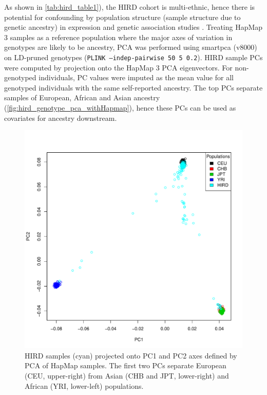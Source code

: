 As shown in \autoref{tab:hird_table1}), the \gls{HIRD} cohort is multi-ethnic, hence there is potential for confounding by population structure (sample structure due to genetic ancestry) in expression and genetic association studies \autocite{price2006PrincipalComponentsAnalysis,eu-ahsunthornwattana2014ComparisonMethodsAccount,brown2018ExpressionReflectsPopulation}.
Treating HapMap 3 samples as a reference population where the major axes of variation in genotypes are likely to be ancestry, \gls{PCA} was performed using smartpca (v8000) on \gls{LD}-pruned genotypes (\texttt{PLINK --indep-pairwise 50 5 0.2}).
\gls{HIRD} sample \glspl{PC} were computed by projection onto the HapMap 3 \gls{PCA} eigenvectors.
For non-genotyped individuals, \gls{PC} values were imputed as the mean value for all genotyped individuals with the same self-reported ancestry.
The top \glspl{PC} separate samples of European, African and Asian ancestry (\autoref{fig:hird_genotype_pca_withHapmap}), hence these \glspl{PC} can be used as covariates for ancestry downstream.

\begin{figure}
    \includegraphics[width=1.0\textwidth]{mainmatter/figures/chapter_02/coreex_eQTLflu_20171204.gencall.smajor.impute_sex.qc3.pruned.hapmap_merged.flipped.pca.evec.pdf}
    \caption{HIRD samples (cyan) projected onto \gls{PC}1 and PC2 axes defined by PCA of HapMap samples. The first two PCs separate European (CEU, upper-right) from Asian (CHB and JPT, lower-right) and African (YRI, lower-left) populations.}
    \label{fig:hird_genotype_pca_withHapmap}
\end{figure}


